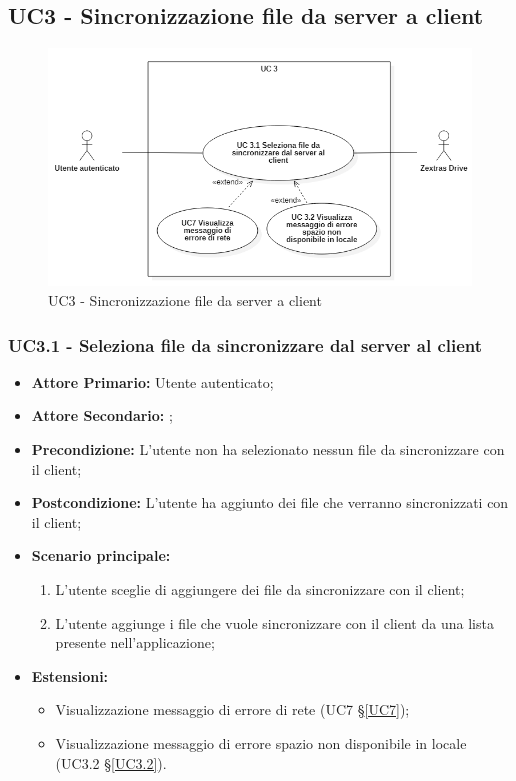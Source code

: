 \subsection{UC3 - Sincronizzazione file da server a client}
\begin{figure}[H]
    \centering
    \includegraphics[scale = 0.6]{components/img/UC3.png}
    \caption{UC3 - Sincronizzazione file da server a client}
\end{figure}
\subsubsection{UC3.1 - Seleziona file da sincronizzare dal server al client}
\begin{itemize}
\item \textbf{Attore Primario:} Utente autenticato;
\item \textbf{Attore Secondario:} ;
\item \textbf{Precondizione:} L'utente non ha selezionato nessun file da sincronizzare con il client;
\item \textbf{Postcondizione:} L'utente ha aggiunto dei file che verranno sincronizzati con il client;
\item \textbf{Scenario principale:}
    \begin{enumerate}
    \item L'utente sceglie di aggiungere dei file da sincronizzare con il client;
    \item L'utente aggiunge i file che vuole sincronizzare con il client da una lista presente nell'applicazione;
    \end{enumerate}
\item \textbf{Estensioni:}
    \begin{itemize}
    \item Visualizzazione messaggio di errore di rete (UC7 \S{}\ref{UC7});
    \item Visualizzazione messaggio di errore spazio non disponibile in locale (UC3.2 \S{}\ref{UC3.2}).
    \end{itemize}
\end{itemize}
